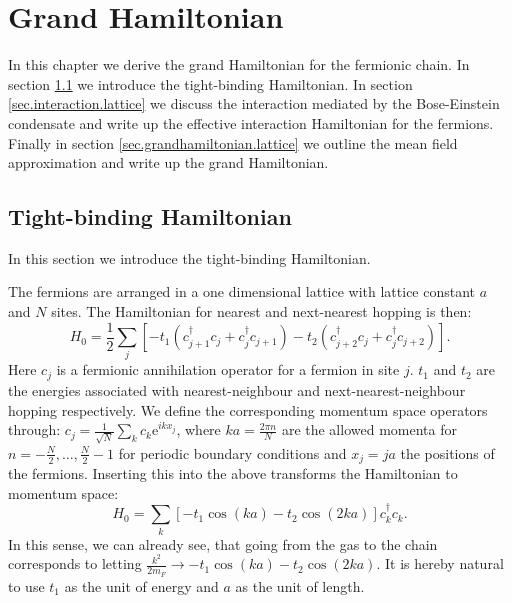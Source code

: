 
\chapter{Grand Hamiltonian} %

\label{Chapter12} %

In this chapter we derive the grand Hamiltonian for the fermionic chain. In section \ref{sec.TightbindingHam.lattice} we introduce the tight-binding Hamiltonian. In section \ref{sec.interaction.lattice} we discuss the interaction mediated by the Bose-Einstein condensate and write up the effective interaction Hamiltonian for the fermions. Finally in section \ref{sec.grandhamiltonian.lattice} we outline the mean field approximation and write up the grand Hamiltonian. 

\section{Tight-binding Hamiltonian} \label{sec.TightbindingHam.lattice}
In this section we introduce the tight-binding Hamiltonian. 

The fermions are arranged in a one dimensional lattice with lattice constant $a$ and $N$ sites. The Hamiltonian for nearest and next-nearest hopping is then:
\begin{equation}
H_{0} = \frac{1}{2}\sum_{j} \left[- t_1(c^\dagger_{j+1}c_j + c^\dagger_j c_{j + 1}) - t_2(c^\dagger_{j + 2}c_j + c^\dagger_j c_{j + 2}) \right].
\label{eq.Htightbindingrealspace} 
\end{equation}
Here $c_j$ is a fermionic annihilation operator for a fermion in site $j$. $t_1$ and $t_2$ are the energies associated with nearest-neighbour and next-nearest-neighbour hopping respectively. We define the corresponding momentum space operators through: $c_j = \frac{1}{\sqrt{N}}\sum_{k} c_k \text{e}^{ikx_j}$, where $ka = \frac{2\pi n}{N}$ are the allowed momenta for $n = -\frac{N}{2}, \dots, \frac{N}{2} - 1$ for periodic boundary conditions and $x_j = ja$ the positions of the fermions. Inserting this into the above transforms the Hamiltonian to momentum space:
\begin{equation}
H_{0} = \sum_k \left[ - t_1\cos(ka) - t_2\cos(2ka)\right]c^\dagger_kc_k.
\label{eq.Htightbindingmomentumspace} 
\end{equation}
In this sense, we can already see, that going from the gas to the chain corresponds to letting $\frac{k^2}{2m_F} \to - t_1\cos(ka) - t_2\cos(2ka)$. It is hereby natural to use $t_1$ as the unit of energy and $a$ as the unit of length.

